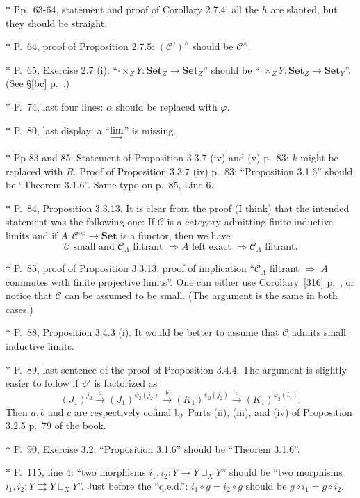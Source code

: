 \documentclass[12pt]{article}%
\theoremstyle{remark}
\theoremstyle{definition}
\newcommand{\C}{\mathcal C}
\newcommand{\Set}{\mathbf{Set}}
\newcommand{\parar}{\rightrightarrows}
\newcommand{\then}{\Rightarrow}
\newcommand{\xr}{\xrightarrow}
\newcommand{\ilim}{\operatornamewithlimits{\underset{\longrightarrow}{lim}}}
\DeclareMathOperator{\op}{op}
\begin{document}
\noindent $*$ Pp.~63-64, statement and proof of Corollary 2.7.4: all the $h$ are slanted, but they should be straight.

\noindent $*$ P.~64, proof of Proposition 2.7.5: $(\C')^\wedge$ should be $\C^\wedge$.

\noindent $*$ P.~65, Exercise 2.7 (i): ``$\cdot\times_ZY:\Set_Z\to\Set_Z$'' should be ``$\cdot\times_ZY:\Set_Z\to\Set_Y$''. (See \S\ref{bc} p.~\pageref{bc}.)

\noindent $*$ P.~74, last four lines: $\alpha$ should be replaced with $\varphi$.

\noindent $*$ P.~80, last display: a ``$\displaystyle\ilim$'' is missing.

\noindent $*$ Pp 83 and 85: Statement of Proposition 3.3.7 (iv) and (v) p.~83: $k$ might be replaced with $R$. Proof of Proposition 3.3.7 (iv) p.~83: ``Proposition 3.1.6'' should be ``Theorem 3.1.6''. Same typo on p.~85, Line 6.

\noindent $*$ P.~84, Proposition 3.3.13. It is clear from the proof (I think) that the intended statement was the following one: If $\C$ is a category admitting finite inductive limits and if $A:\C^{\op}\to\Set$ is a functor, then we have 
$$
\C\text{ small and }\C_A\text{ filtrant }\then A\text{ left exact }\then\C_A\text{ filtrant}.
$$

\noindent $*$ P.~85, proof of Proposition 3.3.13, proof of implication ``$\C_A$ filtrant $\then$ $A$ commutes with finite projective limits''. One can either use Corollary~\ref{316} p.~\pageref{316}, or notice that $\C$ can be assumed to be small. (The argument is the same in both cases.)

\noindent $*$ P.~88, Proposition 3.4.3 (i). It would be better to assume that $\C$ admits small inductive limits.

\noindent $*$ P.~89, last sentence of the proof of Proposition 3.4.4. The argument is slightly easier to follow if $\psi'$ is factorized as 
$$
(J_1)^{j_2}\xr a(J_1)^{\psi_2(j_2)}\xr b(K_1)^{\psi_2(j_2)}\xr c(K_1)^{\varphi_2(i_2)}.
$$ 
Then $a,b$ and $c$ are respectively cofinal by Parts (ii), (iii), and (iv) of Proposition 3.2.5 p.~79 of the book.

\noindent $*$ P.~90, Exercise 3.2: ``Proposition 3.1.6'' should be ``Theorem 3.1.6''.

\noindent $*$ P.~115, line 4: ``two morphisms $i_1,i_2:Y\to Y\sqcup_XY$'' should be ``two morphisms $i_1,i_2:Y\parar Y\sqcup_XY$''. Just before the ``q.e.d.'': $i_1\circ g=i_2\circ g$ should be $g\circ i_1=g\circ i_2$.
\end{document}

